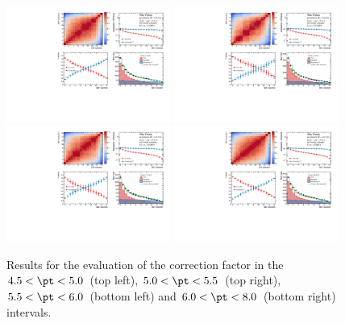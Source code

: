 \begin{figure}
    \centering
    \includegraphics[width=0.48\textwidth]{Figures/Chapter 6/AllPropmtFracs/Dplus/DplusPromptFrac45_50.pdf}
    \includegraphics[width=0.48\textwidth]{Figures/Chapter 6/AllPropmtFracs/Dplus/DplusPromptFrac50_55.pdf}
    \includegraphics[width=0.48\textwidth]{Figures/Chapter 6/AllPropmtFracs/Dplus/DplusPromptFrac55_60.pdf}
    \includegraphics[width=0.48\textwidth]{Figures/Chapter 6/AllPropmtFracs/Dplus/DplusPromptFrac60_80.pdf}
    \caption{Results for the evaluation of the \fpdpl correction factor in the $4.5 < \pt < 5.0$~\gevc (top left), $5.0 < \pt < 5.5$~\gevc (top right), $5.5 < \pt < 6.0$~\gevc (bottom left) and $6.0 < \pt < 8.0$~\gevc (bottom right) intervals.}
\end{figure}

